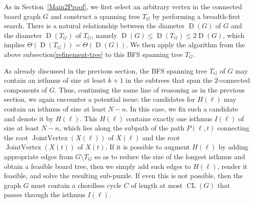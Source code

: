 \documentclass[letter,11pt]{article}
\theoremstyle{definition}
\theoremstyle{definition}
\DeclareMathOperator{\JoiV}{JointVertex}
\DeclareMathOperator{\D}{D}
\DeclareMathOperator{\CL}{CL}
\newcommand{\1}{\boldmath$~1~$\unboldmath}
\newcommand{\tume}{\hspace*{0.2em}}
\begin{document}
As in Section~\ref{Main2Proof}, we first select an arbitrary vertex in the
connected board graph $G$ and construct a spanning tree $T_G$ by performing
a breadth-first search.
There is a natural relationship between the diameter $\D(G)$ of $G$
and the diameter $\D(T_G)$ of $T_G$, namely
$\D(G) \le \D(T_G) \le 2\D(G)$,
which implies $\Theta(\D(T_G)) = \Theta(\D(G))$.
We then apply the algorithm from the above 
subsection\tume\ref{refinement-tree} to this BFS spanning tree $T_G$. 

As already discussed in the previous section, the BFS spanning tree $T_G$ of $G$ may contain 
an isthmus of size at least $k+1$ in the subtrees that span the $2$-connected components of $G$.
Thus, continuing the same line of reasoning as in the previous section, we again encounter a potential issue:
the candidates for $H(\ell)$ may contain an isthmus of size at least $N-n$.
In this case, we fix such a candidate and denote it by $H(\ell)$.
This $H(\ell)$ contains exactly one isthmus $I(\ell)$ of size at least $N - n$, which lies along the subpath 
of the path $P(\ell, t)$ connecting the root $\JoiV(X(\ell))$ of $X(\ell)$ and the root $\JoiV(X(t))$ of $X(t)$.
If it is possible to augment $H(\ell)$ by adding appropriate edges from $G \setminus T_G$ so as to reduce the 
size of the longest isthmus and obtain a feasible board tree, then we simply add such edges to $H(\ell)$, 
render it feasible, and solve the resulting sub-puzzle.
If even this is not possible, then the graph $G$ must contain a chordless cycle $C$ of length at most $\CL(G)$
that passes through the isthmus $I(\ell)$.
\end{document}
